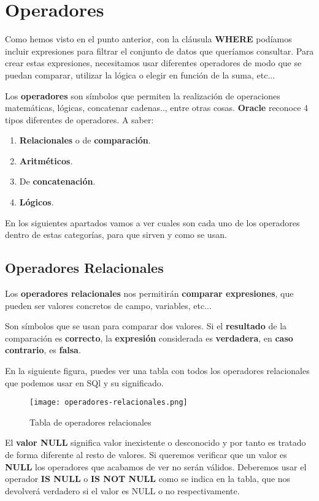 \section{Operadores}
Como hemos visto en el punto anterior, con la cláusula \textbf{WHERE} podíamos incluir expresiones para filtrar el conjunto de datos que queríamos consultar. Para crear estas expresiones, necesitamos usar diferentes operadores de modo que se puedan comparar, utilizar la lógica o elegir en función de la suma, etc...

Los \textbf{operadores} son símbolos que permiten la realización de operaciones matemáticas, lógicas, concatenar cadenas.., entre otras cosas. \textbf{Oracle} reconoce 4 tipos diferentes de operadores. A saber:

\begin{enumerate}
    \item \textbf{Relacionales} o de \textbf{comparación}.
    \item \textbf{Aritméticos}.
    \item De \textbf{concatenación}.
    \item \textbf{Lógicos}.
\end{enumerate}

En los siguientes apartados vamos a ver cuales son cada uno de los operadores dentro de estas categorías, para que sirven y como se usan.

\subsection{Operadores Relacionales}
Los \textbf{operadores relacionales} nos permitirán \textbf{comparar expresiones}, que pueden ser valores concretos de campo, variables, etc...

Son símbolos que se usan para comparar dos valores. Si el \textbf{resultado} de la comparación es \textbf{correcto}, la \textbf{expresión} considerada es \textbf{verdadera}, en \textbf{caso contrario}, es \textbf{falsa}.

En la siguiente figura, puedes ver una tabla con todos los operadores relacionales que podemos usar en SQl y su significado.

\begin{figure}[H]
    \centering
    \texttt{[image: operadores-relacionales.png]}
    \caption{Tabla de operadores relacionales}
\end{figure}

El \textbf{valor NULL} significa valor inexistente o desconocido y por tanto es tratado de forma diferente al resto de valores. Si queremos verificar que un valor es \textbf{NULL} los operadores que acabamos de ver no serán válidos. Deberemos usar el operador \textbf{IS NULL} o \textbf{IS NOT NULL} como se indica en la tabla, que nos devolverá verdadero si el valor es NULL o no respectivamente.


